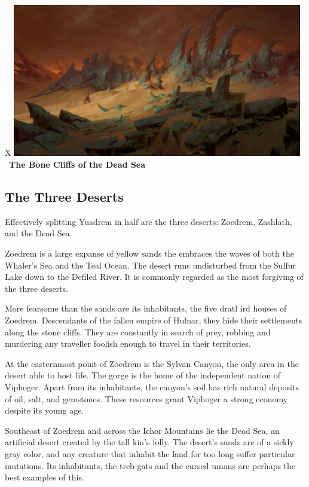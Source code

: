 
\begin{table}[b]%
    \begin{DndTable}[width=\linewidth]{X}
        \centering
        \includegraphics[width=0.95\textwidth]{01yuadrem/img/12dead_sea.png} \
        \centering \large{\textbf{The Bone Cliffs of the Dead Sea}}
    \end{DndTable}
\end{table}

\subsection*{The Three Deserts} \label{ssec::threedeserts}
Effectively splitting Yuadrem in half are the three deserts: Zoedrem, Zashlath, and the Dead Sea.

Zoedrem is a large expanse of yellow sands the embraces the waves of both the Whaler's Sea and the Teal Ocean.
The desert runs undisturbed from the Sulfur Lake down to the Defiled River.
It is commonly regarded as the most forgiving of the three deserts.

More fearsome than the sands are its inhabitants, the five dratl ird houses of Zoedrem.
Descendants of the fallen empire of Hulnar, they hide their settlements along the stone cliffs.
They are constantly in search of prey, robbing and murdering any traveller foolish enough to travel in their territories.

At the easternmost point of Zoedrem is the Sylvan Canyon, the only area in the desert able to host life.
The gorge is the home of the independent nation of Viphoger.
Apart from its inhabitants, the canyon's soil has rich natural deposits of oil, salt, and gemstones.
These resources grant Viphoger a strong economy despite its young age.

Southeast of Zoedrem and across the Ichor Mountains lie the Dead Sea, an artificial desert created by the tall kin's folly.
The desert's sands are of a sickly gray color, and any creature that inhabit the land for too long suffer particular mutations.
Its inhabitants, the treb gats and the cursed umans are perhaps the best examples of this.

